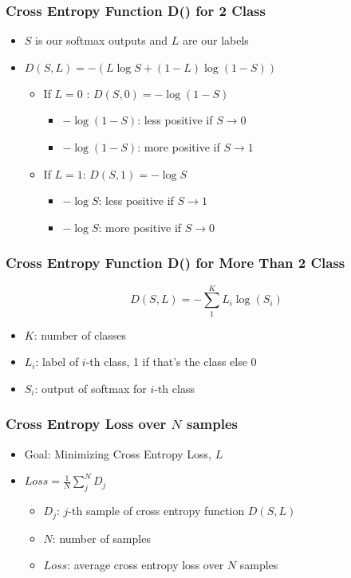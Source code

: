 \documentclass[14 pt]{beamer}
\let\olditem\item
\renewcommand{\item}{\olditem\vspace{4pt}}
\begin{document}
\begin{frame}
  \frametitle{Cross Entropy Function D() for 2 Class}
  \begin{itemize}
  \item $S$  is our softmax outputs and $L$ are our labels
  \item $D(S, L) = -(L\log S + (1 - L)\log (1 - S))$
    \begin{itemize}
    \item If $L = 0$ : $D(S, 0)  = -\log(1 - S)$
      \begin{itemize}
      \item $-\log (1 - S)$: less positive if $S \to 0$
      \item $-\log (1 - S)$: more positive if $S \to 1$
      \end{itemize}
    \item If $L = 1$: $D(S, 1) = -\log S$
      \begin{itemize}
      \item $-\log S$: less positive if $S\to 1$
      \item $-\log S$: more positive if $S\to 0$
      \end{itemize}
    \end{itemize}
  \end{itemize}
\end{frame}

\begin{frame}
  \frametitle{Cross Entropy Function D() for More Than 2 Class}
  \begin{displaymath}
    D(S, L) = -\sum_1^K L_i \log (S_i)
  \end{displaymath}
  \begin{itemize}
  \item $K$: number of classes
  \item $L_i$: label of $i$-th class, 1 if that's the class else 0
  \item $S_i$: output of softmax for $i$-th class
  \end{itemize}
\end{frame}

\begin{frame}
  \frametitle{Cross Entropy Loss over $N$ samples}
  \begin{itemize}
  \item Goal: Minimizing Cross Entropy Loss, $L$
  \item $Loss = \frac{1}{N}\sum_j^N D_j$
    \begin{itemize}
    \item $D_j$: $j$-th sample of cross entropy function $D(S, L)$
    \item $N$: number of samples
    \item $Loss$: average cross entropy loss over $N$ samples
    \end{itemize}
  \end{itemize}
  
\end{frame}
\end{document}
